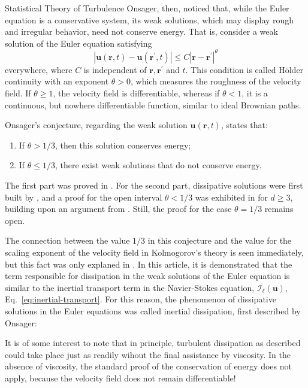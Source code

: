 \begin{chapter}{Statistical Theory of Turbulence}
Onsager, then, noticed that, while the Euler equation is a conservative system,
its weak solutions, which may display rough and irregular behavior, need not
conserve energy. That is,
consider a weak solution of the Euler equation satisfying
\begin{equation}
	\left|\mathbf{u}(\mathbf{r}, t)-\mathbf{u}(\mathbf{r}^{\prime}, t )\right| \leq C\left|\mathbf{r}-\mathbf{r}^{\prime}\right|^{\theta}
\end{equation}
everywhere, where $C$ is independent of $\mathbf{r},\mathbf{r}^{\prime}$ and $t$.
This condition is called Hölder continuity with an exponent $\theta > 0$, which measures the roughness of the velocity field.
If $\theta \geq 1$, the velocity field is differentiable, whereas if $\theta < 1$, it is a continuous, but nowhere
differentiable function, similar to ideal Brownian paths.

Onsager's conjecture, regarding the weak solution $\mathbf{u}(\mathbf{r}, t)$, states that:
\begin{enumerate}
	\item If $\theta > 1/3$, then this solution conserves energy;
	\item If $\theta \leq 1/3$, there exist weak solutions that do not conserve energy.
\end{enumerate}
The first part was proved in \textcite{constantin1994}.
For the second part, dissipative solutions were first built by \textcite{scheffer1993,shnirelman1997}, and a proof for the open interval $\theta < 1/3$ was
exhibited in \textcite{isett2018} for $d \geq 3$, building upon an argument from \textcite{delellis2007}. Still, the proof
for the case $\theta = 1/3$ remains open.

The connection between the value $1/3$ in this conjecture and the value for the scaling
exponent of the velocity field in Kolmogorov's theory is seen immediately,
but this fact was only explaned in \textcite{duchon2000}.
In this article, it is demonstrated that the term responsible for
dissipation in the weak solutions of the Euler equation
is similar to the inertial transport term
in the Navier-Stokes equation, $\mathcal{I}_{\ell}(\bm{u})$,
Eq.~\eqref{eq:inertial-transport}.
For this reason, the phenomenon of dissipative solutions in the Euler equations was called inertial
dissipation, first described by Onsager:
\begin{displayquote}
	It is of some interest to note that in principle, turbulent dissipation
	as described could take place just as readily wihout the final
	assistance by viscosity. In the absence of viscosity, the standard
	proof of the conservation of energy does not apply, because the velocity
	field does not remain differentiable!
	\parencite{onsager1949statistical}
\end{displayquote}


\end{chapter}
